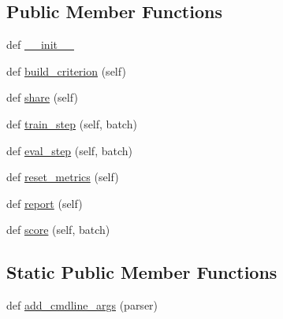 \subsection*{Public Member Functions}
\begin{DoxyCompactItemize}
\item 
def \hyperlink{classparlai_1_1core_1_1torch__classifier__agent_1_1TorchClassifierAgent_a086eb865c3a6586372671ec1254f0d66}{\+\_\+\+\_\+init\+\_\+\+\_\+}
\item 
def \hyperlink{classparlai_1_1core_1_1torch__classifier__agent_1_1TorchClassifierAgent_adeab756c0b58667aaf417575c23d1dfb}{build\+\_\+criterion} (self)
\item 
def \hyperlink{classparlai_1_1core_1_1torch__classifier__agent_1_1TorchClassifierAgent_a33e56566ee5e81b257b049bd6a3c1cd6}{share} (self)
\item 
def \hyperlink{classparlai_1_1core_1_1torch__classifier__agent_1_1TorchClassifierAgent_a3baacdb005c5f5a6367c45c93d21d398}{train\+\_\+step} (self, batch)
\item 
def \hyperlink{classparlai_1_1core_1_1torch__classifier__agent_1_1TorchClassifierAgent_a5d456df843180fb32ca574dc2a33cc80}{eval\+\_\+step} (self, batch)
\item 
def \hyperlink{classparlai_1_1core_1_1torch__classifier__agent_1_1TorchClassifierAgent_ac96e55ac13019eace0641a7efcf6dc44}{reset\+\_\+metrics} (self)
\item 
def \hyperlink{classparlai_1_1core_1_1torch__classifier__agent_1_1TorchClassifierAgent_acf3aabdf7a98e434614c4da20c599df2}{report} (self)
\item 
def \hyperlink{classparlai_1_1core_1_1torch__classifier__agent_1_1TorchClassifierAgent_a04e97e79ef7e497c0927c10b31e42337}{score} (self, batch)
\end{DoxyCompactItemize}
\subsection*{Static Public Member Functions}
\begin{DoxyCompactItemize}
\item 
def \hyperlink{classparlai_1_1core_1_1torch__classifier__agent_1_1TorchClassifierAgent_ac1dcd540b081131810d3472e91920fa7}{add\+\_\+cmdline\+\_\+args} (parser)
\end{DoxyCompactItemize}
